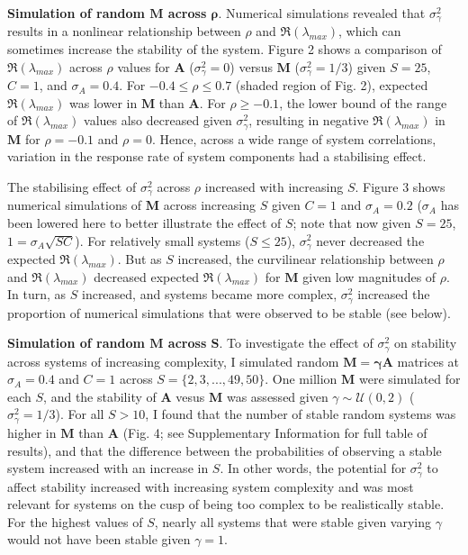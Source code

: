 \documentclass[]{article}
\begin{document}
\textbf{Simulation of random \(\mathbf{M}\) across \(\mathbf{\rho}\)}.
Numerical simulations revealed that \(\sigma^{2}_{\gamma}\) results in a
nonlinear relationship between \(\rho\) and \(\Re(\lambda_{max})\),
which can sometimes increase the stability of the system. Figure 2 shows
a comparison of \(\Re(\lambda_{max})\) across \(\rho\) values for
\(\mathbf{A}\) (\(\sigma^{2}_{\gamma} = 0\)) versus \(\mathbf{M}\)
(\(\sigma^{2}_{\gamma} = 1/3\)) given \(S = 25\), \(C = 1\), and
\(\sigma_{A} = 0.4\). For \(-0.4 \leq \rho \leq 0.7\) (shaded region of
Fig. 2), expected \(\Re(\lambda_{max})\) was lower in \(\mathbf{M}\)
than \(\mathbf{A}\). For \(\rho \geq -0.1\), the lower bound of the
range of \(\Re(\lambda_{max})\) values also decreased given
\(\sigma^{2}_{\gamma}\), resulting in negative \(\Re(\lambda_{max})\) in
\(\mathbf{M}\) for \(\rho = -0.1\) and \(\rho = 0\). Hence, across a
wide range of system correlations, variation in the response rate of
system components had a stabilising effect.

The stabilising effect of \(\sigma^{2}_{\gamma}\) across \(\rho\)
increased with increasing \(S\). Figure 3 shows numerical simulations of
\(\mathbf{M}\) across increasing \(S\) given \(C = 1\) and
\(\sigma_{A} = 0.2\) (\(\sigma_{A}\) has been lowered here to better
illustrate the effect of \(S\); note that now given \(S = 25\),
\(1 = \sigma_{A}\sqrt{SC}\)). For relatively small systems
(\(S \leq 25\)), \(\sigma^{2}_{\gamma}\) never decreased the expected
\(\Re(\lambda_{max})\). But as \(S\) increased, the curvilinear
relationship between \(\rho\) and \(\Re(\lambda_{max})\) decreased
expected \(\Re(\lambda_{max})\) for \(\mathbf{M}\) given low magnitudes
of \(\rho\). In turn, as \(S\) increased, and systems became more
complex, \(\sigma^{2}_{\gamma}\) increased the proportion of numerical
simulations that were observed to be stable (see below).

\textbf{Simulation of random \(\mathbf{M}\) across \(\mathbf{S}\)}. To
investigate the effect of \(\sigma^{2}_{\gamma}\) on stability across
systems of increasing complexity, I simulated random
\(\mathbf{M = \gamma A}\) matrices at \(\sigma_{A} = 0.4\) and \(C = 1\)
across \(S = \{2, 3, ..., 49, 50\}\). One million \(\mathbf{M}\) were
simulated for each \(S\), and the stability of \(\mathbf{A}\) vesus
\(\mathbf{M}\) was assessed given \(\gamma \sim \mathcal{U}(0, 2)\)
(\(\sigma^{2}_{\gamma} = 1/3\)). For all \(S > 10\), I found that the
number of stable random systems was higher in \(\mathbf{M}\) than
\(\mathbf{A}\) (Fig. 4; see Supplementary Information for full table of
results), and that the difference between the probabilities of observing
a stable system increased with an increase in \(S\). In other words, the
potential for \(\sigma^{2}_{\gamma}\) to affect stability increased with
increasing system complexity and was most relevant for systems on the
cusp of being too complex to be realistically stable. For the highest
values of \(S\), nearly all systems that were stable given varying
\(\gamma\) would not have been stable given \(\gamma = 1\).
\end{document}
